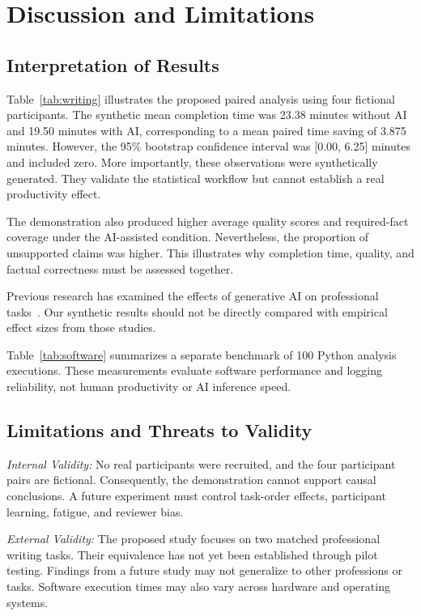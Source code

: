 
\section{Discussion and Limitations}
\label{sec:discussion}

\subsection{Interpretation of Results}

Table~\ref{tab:writing} illustrates the proposed paired
analysis using four fictional participants. The synthetic
mean completion time was 23.38 minutes without AI and
19.50 minutes with AI, corresponding to a mean paired
time saving of 3.875 minutes. However, the 95\% bootstrap
confidence interval was [0.00, 6.25] minutes and included
zero. More importantly, these observations were
synthetically generated. They validate the statistical
workflow but cannot establish a real productivity effect.

The demonstration also produced higher average quality
scores and required-fact coverage under the AI-assisted
condition. Nevertheless, the proportion of unsupported
claims was higher. This illustrates why completion time,
quality, and factual correctness must be assessed together.

Previous research has examined the effects of generative
AI on professional tasks~\cite{noyExperimentalEvidenceProductivity2023,
dellacquaNavigatingJaggedTechnological2026}.
Our synthetic results should not be directly compared
with empirical effect sizes from those studies.

Table~\ref{tab:software} summarizes a separate benchmark
of 100 Python analysis executions. These measurements
evaluate software performance and logging reliability,
not human productivity or AI inference speed.

\subsection{Limitations and Threats to Validity}

\textit{Internal Validity:}
No real participants were recruited, and the four
participant pairs are fictional. Consequently, the
demonstration cannot support causal conclusions.
A future experiment must control task-order effects,
participant learning, fatigue, and reviewer bias.

\textit{External Validity:}
The proposed study focuses on two matched professional
writing tasks. Their equivalence has not yet been
established through pilot testing. Findings from a future
study may not generalize to other professions or tasks.
Software execution times may also vary across hardware
and operating systems.

